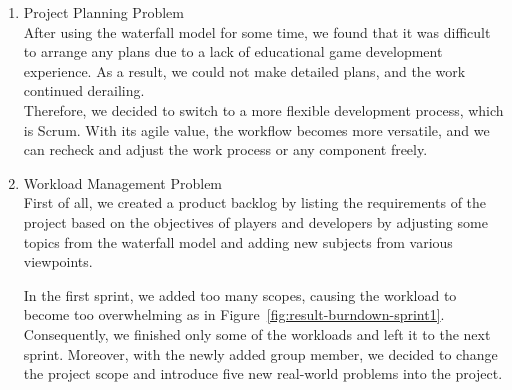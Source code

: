 \documentclass[12pt,oneside,openright,a4paper]{cpe-english-project}
\begin{document}
\begin{enumerate}
	\item Project Planning Problem \\
	After using the waterfall model for some time, we found that it was difficult to arrange any plans due to a lack of educational game development experience. As a result, we could not make detailed plans, and the work continued derailing. \\
	Therefore, we decided to switch to a more flexible development process, which is Scrum. With its agile value, the workflow becomes more versatile, and we can recheck and adjust the work process or any component freely.

	\item Workload Management Problem \\
	First of all, we created a product backlog by listing the requirements of the project based on the objectives of players and developers by adjusting some topics from the waterfall model and adding new subjects from various viewpoints. \\
	\begin{minipage}[c]{\textwidth}\centering
	\label{fig:result-burndown-sprint1}
	\end{minipage}
	In the first sprint, we added too many scopes, causing the workload to become too overwhelming as in Figure~\ref{fig:result-burndown-sprint1}. Consequently, we finished only some of the workloads and left it to the next sprint. Moreover, with the newly added group member, we decided to change the project scope and introduce five new real-world problems into the project. \\
	\begin{minipage}[c]{\textwidth}\centering

\end{minipage}
\end{enumerate}
\end{document}
